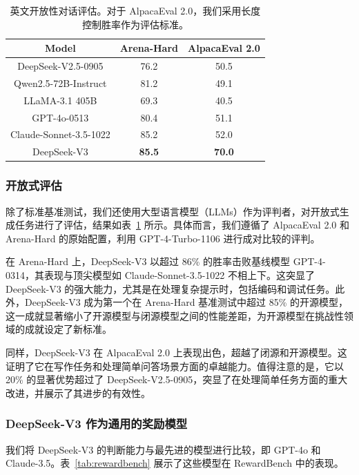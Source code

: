 \documentclass[lang=cn,a4paper,newtx]{elegantpaper}
\newcommand{\dsviii}{DeepSeek-V3}
\begin{document}
\begin{table}[t]
    \centering
    \begin{tabular}{c | c c}
    \toprule
    \textbf{Model} & \textbf{Arena-Hard} & \textbf{AlpacaEval 2.0} \\
    \midrule
    DeepSeek-V2.5-0905 & 76.2 & 50.5\\
    Qwen2.5-72B-Instruct & 81.2 & 49.1  \\
    LLaMA-3.1 405B & 69.3 & 40.5\\
    GPT-4o-0513 & 80.4 &  51.1 \\
    Claude-Sonnet-3.5-1022 & 85.2  & 52.0 \\
    DeepSeek-V3 & \textbf{85.5} & \textbf{70.0} \\
    \bottomrule
    \end{tabular}
    \caption{英文开放性对话评估。对于 AlpacaEval 2.0，我们采用长度控制胜率作为评估标准。}
    \label{tab:open} 
\end{table}

\subsubsection{开放式评估}

除了标准基准测试，我们还使用大型语言模型（LLMs）作为评判者，对开放式生成任务进行了评估，结果如表~\ref{tab:open} 所示。具体而言，我们遵循了 AlpacaEval 2.0 和 Arena-Hard 的原始配置，利用 GPT-4-Turbo-1106 进行成对比较的评判。

在 Arena-Hard 上，\dsviii{} 以超过 86\% 的胜率击败基线模型 GPT-4-0314，其表现与顶尖模型如 Claude-Sonnet-3.5-1022 不相上下。这突显了 \dsviii{} 的强大能力，尤其是在处理复杂提示时，包括编码和调试任务。此外，\dsviii{} 成为第一个在 Arena-Hard 基准测试中超过 85\% 的开源模型，这一成就显著缩小了开源模型与闭源模型之间的性能差距，为开源模型在挑战性领域的成就设定了新标准。

同样，\dsviii{} 在 AlpacaEval 2.0 上表现出色，超越了闭源和开源模型。这证明了它在写作任务和处理简单问答场景方面的卓越能力。值得注意的是，它以 20\% 的显著优势超过了 DeepSeek-V2.5-0905，突显了在处理简单任务方面的重大改进，并展示了其进步的有效性。

\subsubsection{\dsviii{} 作为通用的奖励模型}

我们将 \dsviii{} 的判断能力与最先进的模型进行比较，即 GPT-4o 和 Claude-3.5。表~\ref{tab:rewardbench} 展示了这些模型在 RewardBench 中的表现。 
\end{document}
